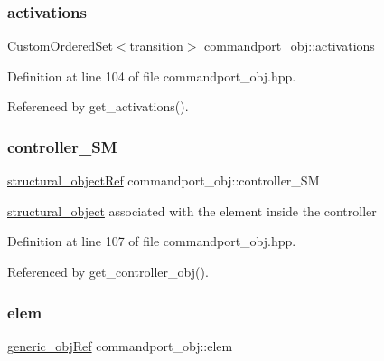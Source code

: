 \subsubsection{\texorpdfstring{activations}{activations}}
{\footnotesize\ttfamily \hyperlink{classCustomOrderedSet}{Custom\+Ordered\+Set}$<$\hyperlink{classcommandport__obj_aae52b929cff6d84d461b91d88baa3203}{transition}$>$ commandport\+\_\+obj\+::activations\hspace{0.3cm}{\ttfamily [private]}}



Definition at line 104 of file commandport\+\_\+obj.\+hpp.



Referenced by get\+\_\+activations().

\mbox{\label{classcommandport__obj_a9aec5239255143976852aedfafaa12c6}} 
\subsubsection{\texorpdfstring{controller\+\_\+\+SM}{controller\_SM}}
{\footnotesize\ttfamily \hyperlink{structural__objects_8hpp_a8ea5f8cc50ab8f4c31e2751074ff60b2}{structural\+\_\+object\+Ref} commandport\+\_\+obj\+::controller\+\_\+\+SM\hspace{0.3cm}{\ttfamily [private]}}



\hyperlink{classstructural__object}{structural\+\_\+object} associated with the element inside the controller 



Definition at line 107 of file commandport\+\_\+obj.\+hpp.



Referenced by get\+\_\+controller\+\_\+obj().

\mbox{\label{classcommandport__obj_af40c778f133bfc50cd03633da1da2457}} 
\subsubsection{\texorpdfstring{elem}{elem}}
{\footnotesize\ttfamily \hyperlink{generic__obj_8hpp_acb533b2ef8e0fe72e09a04d20904ca81}{generic\+\_\+obj\+Ref} commandport\+\_\+obj\+::elem\hspace{0.3cm}{\ttfamily [private]}}



